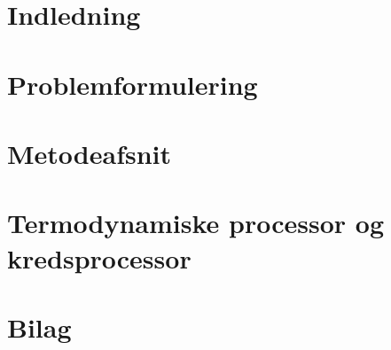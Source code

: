 \documentclass[12pt,a4paper]{article}
\author{Christian Kaae Larsen}
\begin{document}
	\tableofcontents
	
	\section{Indledning}
	
	
	\section{Problemformulering}
	
	
	\section{Metodeafsnit} %
	
	
	\section{Termodynamiske processor og kredsprocessor}
	
		
	\section{Bilag}
	
		
			
			
			
			
			
			
\end{document}
